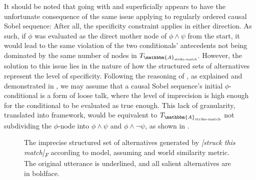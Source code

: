 It should be noted that going with \textcite{Bennett2003} and \textcite{Arregui2009} superficially appears to have the unfortunate consequence of the same issue applying to regularly ordered causal Sobel sequence: After all, the specificity constraint applies in either direction. As such, if $\phi$ was evaluated as the direct mother node of $\phi\land\psi$ from the start, it would lead to the same violation of the two conditionals' antecedents not being dominated by the same number of nodes in $T_{\mathbbm{A}_\textit{strike-match}}$. However, the solution to this issue lies in the nature of how the structured sets of alternatives represent the level of specificity. Following the reasoning of \textcite{Klecha2014,Klecha2015}, as explained and demonstrated in , we may assume that a causal Sobel sequence's initial $\phi$-conditional is a form of loose talk, where the level of imprecision is high enough for the conditional to be evaluated as true enough. This lack of granularity, translated into  framework, would be equivalent to $T_{\mathbbm{A}_\text{strike-match}}$ not subdividing the $\phi$-node into $\phi\land\psi$ and $\phi\land\neg\psi$, as shown in .
\begin{figure}[!htb]
    \centering\hspace{-4cm}
    
    \caption{The imprecise structured set of alternatives generated by \textit{[struck this match]\textsubscript{F}} according to  model, assuming \textcite{Bennett2003} and  world similarity metric. The original utterance is underlined, and all salient alternatives are in boldface.}
\end{figure}

